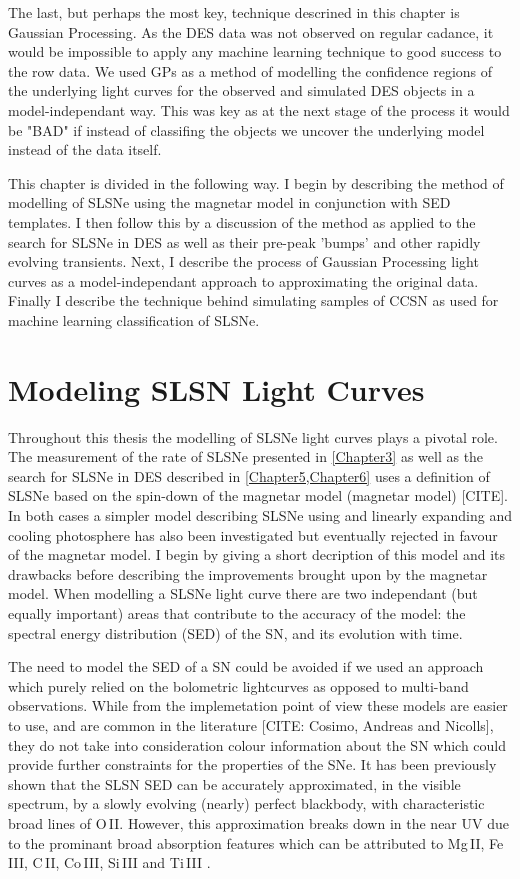 The last, but perhaps the most key, technique descrined in this chapter is Gaussian Processing. As the DES data was not observed on regular cadance, it would be impossible to apply any machine learning technique to good success to the row data. We used GPs as a method of modelling the confidence regions of the underlying light curves for the observed and simulated DES objects in a model-independant way. This was key as at the next stage of the process it would be "BAD" if instead of classifing the objects we uncover the underlying model instead of the data itself.

This chapter is divided in the following way. I begin by describing the method of modelling of SLSNe using the magnetar model in conjunction with SED templates. I then follow this by a discussion of the method as applied to the search for SLSNe in DES as well as their pre-peak 'bumps' and other rapidly evolving transients. Next, I describe the process of Gaussian Processing light curves as a model-independant approach to approximating the original data. Finally I describe the technique behind simulating samples of CCSN as used for machine learning classification of SLSNe.

\section{Modeling SLSN Light Curves} \label{sec:SLAP}
Throughout this thesis the modelling of SLSNe light curves plays a pivotal role. The measurement of the rate of SLSNe presented in \cref{Chapter3} as well as the search for SLSNe in DES described in \cref{Chapter5,Chapter6} uses a definition of SLSNe based on the spin-down of the magnetar model (magnetar model) [CITE]. In both cases a simpler model describing SLSNe using and linearly expanding and cooling photosphere has also been investigated but eventually rejected in favour of the magnetar model. I begin by giving a short decription of this model and its drawbacks before describing the improvements brought upon by the magnetar model. When modelling a SLSNe light curve there are two independant (but equally important) areas that contribute to the accuracy of the model: the spectral energy distribution (SED) of the SN, and its evolution with time.

The need to model the SED of a SN could be avoided if we used an approach which purely relied on the bolometric lightcurves as opposed to multi-band observations. While from the implemetation point of view these models are easier to use, and are common in the literature [CITE: Cosimo, Andreas and Nicolls], they do not take into consideration colour information about the SN which could provide further constraints for the properties of the SNe. It has been previously shown \citep{2011ApJ...743..114C,2013ApJ...779...98H,2015MNRAS.449.1215P,2014ApJ...797...24V} that the SLSN SED can be accurately approximated, in the visible spectrum, by a slowly evolving (nearly) perfect blackbody, with characteristic broad lines of O\,II. However, this approximation breaks down in the near UV due to the prominant broad absorption features which can be attributed to Mg\,II, Fe\,III, C\,II, Co\,III, Si\,III and Ti\,III \citep[see][for line identifications]{2016MNRAS.458.3455M}.

